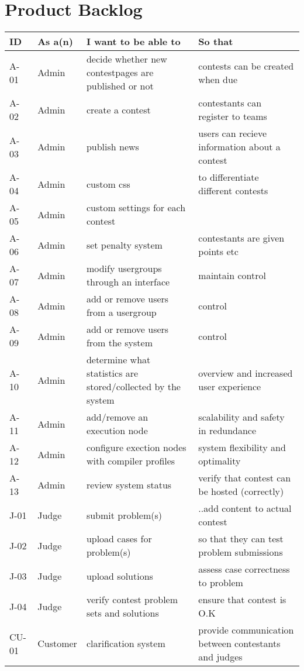 \chapter{Product Backlog}
\begin{tabular}{|p{}|p{}|p{}|p{}|}
\hline
ID&As a(n) &I want to be able to&So that \\
\hline
A-01&Admin&decide whether new contestpages are published or not& contests can be created when due \\
\hline
A-02&Admin &create a contest &contestants can register to teams\\
\hline
A-03&Admin&publish news&users can recieve information about a contest \\
\hline
A-04&Admin&custom css & to differentiate different contests\\
\hline
A-05&Admin&custom settings for each contest & \\
\hline
A-06&Admin&set penalty system&contestants are given points etc\\
\hline
A-07&Admin&modify usergroups through an interface&maintain control\\
\hline
A-08&Admin&add or remove users from a usergroup&control\\
\hline
A-09&Admin&add or remove users from the system&control\\
\hline
A-10&Admin&determine what statistics are stored/collected by the system&overview and increased user experience\\
\hline
A-11&Admin&add/remove an execution node&scalability and safety in redundance\\
\hline
A-12&Admin&configure exection nodes with compiler profiles&system flexibility and optimality\\
\hline
A-13&Admin&review system status&verify that contest can be hosted (correctly)\\
\hline
J-01&Judge&submit problem(s)&..add content to actual contest\\
\hline
J-02&Judge&upload cases for problem(s)&so that they can test problem submissions\\
\hline
J-03&Judge&upload solutions&assess case correctness to problem\\
\hline
J-04&Judge&verify contest problem sets and solutions&ensure that contest is O.K\\
\hline
CU-01&Customer&clarification system&provide communication between contestants and judges\\

\end{tabular}
